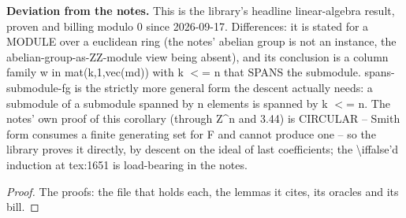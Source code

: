 %
\noindent\textbf{Deviation from the notes.} This is the library's headline linear-algebra result, proven and billing modulo 0 since 2026-09-17.  Differences: it is stated for a MODULE over a euclidean ring (the notes' abelian group is not an instance, the abelian-group-as-ZZ-module view being absent), and its conclusion is a column family w in mat(k,1,vec(md)) with k $<$= n that SPANS the submodule.  spans-submodule-fg is the strictly more general form the descent actually needs: a submodule of a submodule spanned by n elements is spanned by k $<$= n.  The notes' own proof of this corollary (through Z\textasciicircum{}n and 3.44) is CIRCULAR -- Smith form consumes a finite generating set for F and cannot produce one -- so the library proves it directly, by descent on the ideal of last coefficients; the \textbackslash{}iffalse'd induction at tex:1651 is load-bearing in the notes.
%
\renewcommand{\thethm}{3.48}
\begin{prop}\label{thm:principal-sequence-unique}
%
%
\end{prop}
%
\begin{proof}
%
The proofs: the file that holds each, the lemmas it cites, its oracles and its bill.
%
%
%
%
\end{proof}
